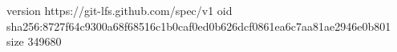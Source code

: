 version https://git-lfs.github.com/spec/v1
oid sha256:8727f64c9300a68f68516c1b0caf0ed0b626dcf0861ea6c7aa81ae2946e0b801
size 349680
